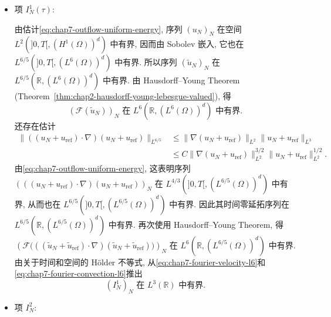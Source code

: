 \begin{sloppypar}
\begin{Proof}
\begin{itemize}
\item 项 $I_N^1(\tau)$:

由估计\eqref{eq:chap7-outflow-uniform-energy}, 序列 $(u_N)_N$ 在空间 $L^2(]0,T[,(H^1(\Omega))^d)$ 中有界, 因而由 Sobolev 嵌入, 它也在 $L^{6/5}(]0,T[,(L^6(\Omega))^d)$ 中有界. 所以序列 $(\widetilde u_N)_N$ 在 $L^{6/5}(\mathbb R,(L^6(\Omega))^d)$ 中有界. 由 Hausdorff--Young Theorem (Theorem~\ref{thm:chap2-hausdorff-young-lebesgue-valued}), 得
\begin{equation}
 (\mathcal F(\widetilde u_N))_N
 \text{ 在 }L^6(\mathbb R,(L^6(\Omega))^d)\text{ 中有界}.
\label{eq:chap7-fourier-velocity-l6}
\end{equation}
还存在估计
\[
\begin{aligned}
 \|((u_N+u_{\mathrm{ref}})\cdot\nabla)(u_N+u_{\mathrm{ref}})\|_{L^{6/5}}
 &\leq\|\nabla(u_N+u_{\mathrm{ref}})\|_{L^2}
 \|u_N+u_{\mathrm{ref}}\|_{L^3}\\
 &\leq C\|\nabla(u_N+u_{\mathrm{ref}})\|_{L^2}^{3/2}
 \|u_N+u_{\mathrm{ref}}\|_{L^2}^{1/2}.
\end{aligned}
\]
由\eqref{eq:chap7-outflow-uniform-energy}, 这表明序列
$(((u_N+u_{\mathrm{ref}})\cdot\nabla)(u_N+u_{\mathrm{ref}}))_N$
在 $L^{4/3}(]0,T[,(L^{6/5}(\Omega))^d)$ 中有界, 从而也在
$L^{6/5}(]0,T[,(L^{6/5}(\Omega))^d)$ 中有界. 因此其时间零延拓序列在
$L^{6/5}(\mathbb R,(L^{6/5}(\Omega))^d)$ 中有界. 再次使用 Hausdorff--Young Theorem, 得
\begin{equation}
 \left(\mathcal F\bigl(((\widetilde u_N+\widetilde u_{\mathrm{ref}})\cdot\nabla)
 (\widetilde u_N+\widetilde u_{\mathrm{ref}})\bigr)\right)_N
 \text{ 在 }L^6(\mathbb R,(L^{6/5}(\Omega))^d)\text{ 中有界}.
\label{eq:chap7-fourier-convection-l6}
\end{equation}
由关于时间和空间的 H\"older 不等式, 从\eqref{eq:chap7-fourier-velocity-l6}和\eqref{eq:chap7-fourier-convection-l6}推出
\begin{equation}
 (I_N^1)_N\text{ 在 }L^3(\mathbb R)\text{ 中有界}.
\label{eq:chap7-fourier-term-one}
\end{equation}

\item 项 $I_N^2$:


\end{itemize}
\end{Proof}
\end{sloppypar}
